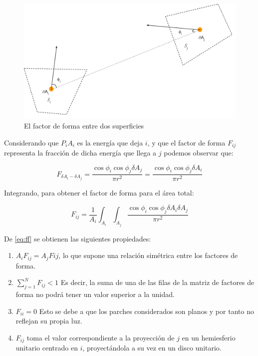 \vspace{5mm}
\begin{figure}[htbp]
	\centering
	\includegraphics[width=0.8\linewidth]{assets/ff}
	\caption{El factor de forma entre dos superficies}
	\label{img:ff2}
\end{figure}


Considerando que ${P}_{i}{A_{i}}$ es la energía que deja $i$, y que el factor de forma $F_{ij}$ representa la fracción de dicha energía que llega a $j$ podemos observar que:

\begin{equation}
    F_{\delta{A_{i}}-\delta{A_{j}}} = \frac{\cos{\phi_{i}}\cos{\phi_{j}}\delta{A_{j}}}{\pi r^{2}} = \frac{\cos{\phi_{i}}\cos{\phi_{j}}\delta{A_{i}}}{\pi{r^{2}}}
\end{equation}

Integrando, para obtener el factor de forma para el área total:

\begin{equation}
    F_{ij} = \frac{1}{A_{i}} \int_{A_{i}}\int_{A_{j}}\frac{\cos{\phi_{i}}\cos{\phi_{j}}\delta{A_{i}}\delta{A_{j}}}{\pi{r^{2}}} \label{eq:ff}    
\end{equation}

De \eqref{eq:ff} se obtienen las siguientes propiedades:
\begin{enumerate}
	\label{propsff}
    \item $A_{i}F_{ij} = A_{j}F{ij}$, lo que supone una relación simétrica entre los factores de forma.
    \item $\sum_{j=1}^{N} F_{ij} < 1$ Es decir, la suma de una de las filas de la matriz de factores de forma no podrá tener un valor superior a la unidad.
    \item $F_{ii} = 0$ Esto se debe a que los parches considerados son planos y por tanto no reflejan su propia luz.
    \item $F_{ij}$ toma el valor correspondiente a la proyección de $j$ en un hemiesferio unitario centrado en $i$, proyectándola a su vez en un disco unitario.
\end{enumerate}


